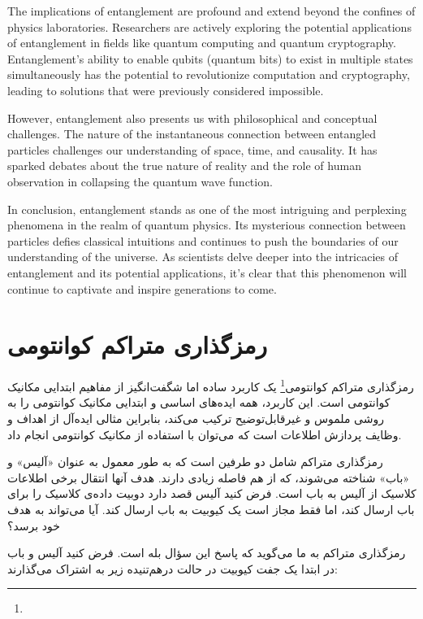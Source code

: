 \documentclass{book}
\begin{document}
The implications of entanglement are profound and extend beyond the confines of physics laboratories. Researchers are actively exploring the potential applications of entanglement in fields like quantum computing and quantum cryptography. Entanglement's ability to enable qubits (quantum bits) to exist in multiple states simultaneously has the potential to revolutionize computation and cryptography, leading to solutions that were previously considered impossible.

However, entanglement also presents us with philosophical and conceptual challenges. The nature of the instantaneous connection between entangled particles challenges our understanding of space, time, and causality. It has sparked debates about the true nature of reality and the role of human observation in collapsing the quantum wave function.

In conclusion, entanglement stands as one of the most intriguing and perplexing phenomena in the realm of quantum physics. Its mysterious connection between particles defies classical intuitions and continues to push the boundaries of our understanding of the universe. As scientists delve deeper into the intricacies of entanglement and its potential applications, it's clear that this phenomenon will continue to captivate and inspire generations to come.


\newpage



\section{رمزگذاری متراکم کوانتومی}

رمزگذاری متراکم کوانتومی\footnote{} یک کاربرد ساده اما شگفت‌انگیز از مفاهیم ابتدایی مکانیک کوانتومی است. این کاربرد، همه ایده‌های اساسی و ابتدایی مکانیک کوانتومی را به روشی ملموس و غیرقابل‌توضیح ترکیب می‌کند، بنابراین مثالی ایده‌آل از اهداف و وظایف پردازش اطلاعات است که می‌توان با استفاده از مکانیک کوانتومی انجام داد.

رمزگذاری متراکم شامل دو طرفین است که به طور معمول به عنوان «آلیس» و «باب» شناخته می‌شوند، که از هم فاصله زیادی دارند. هدف آنها انتقال برخی اطلاعات کلاسیک از آلیس به باب است. فرض کنید آلیس قصد دارد دوبیت داده‌ی کلاسیک را برای باب ارسال کند، اما فقط مجاز است یک کیوبیت به باب ارسال کند. آیا می‌تواند به هدف خود برسد؟

رمزگذاری متراکم به ما می‌گوید که پاسخ این سؤال بله است. فرض کنید آلیس و باب در ابتدا یک جفت کیوبیت در حالت درهم‌تنیده زیر به اشتراک می‌گذارند:
\end{document}
